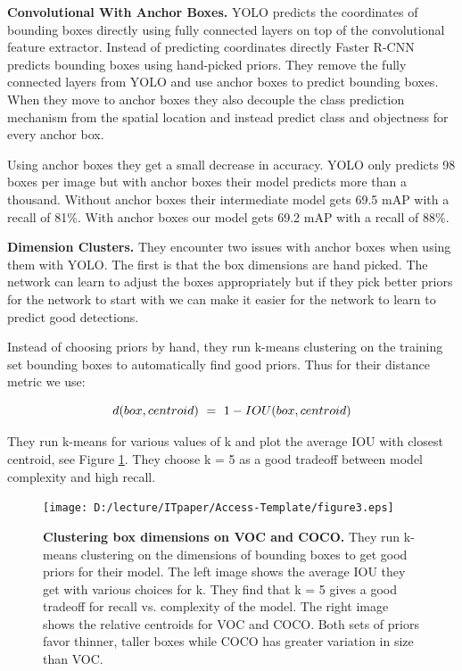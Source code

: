 \documentclass{ieeeaccess}
\begin{document}
\textbf{Convolutional With Anchor Boxes.} YOLO predicts the coordinates of bounding boxes directly using fully connected layers on top of the convolutional feature extractor. Instead of predicting coordinates directly Faster R-CNN predicts bounding boxes using hand-picked priors. They remove the fully connected layers from YOLO and use anchor boxes to predict bounding boxes. When they move to anchor boxes they also decouple the class prediction mechanism from the spatial location and instead predict class and objectness for every anchor box.

Using anchor boxes they get a small decrease in accuracy. YOLO only predicts 98 boxes per image but with anchor boxes their model predicts more than a thousand. Without anchor boxes their intermediate model gets 69.5 mAP with a recall of 81\%. With anchor boxes our model gets 69.2 mAP with a recall of 88\%.

\textbf{Dimension Clusters.} They encounter two issues with anchor boxes when using them with YOLO. The first is that the box dimensions are hand picked. The network can learn to adjust the boxes appropriately but if they pick better priors for the network to start with we can make it easier for the network to learn to predict good detections.

Instead of choosing priors by hand, they run k-means clustering on the training set bounding boxes to automatically find good priors. Thus for their distance metric we use:

\begin{equation}
	\label{equation3}
	 d(box, centroid) \ = \ 1 - IOU(box, centroid) \\
\end{equation}

They run k-means for various values of k and plot the average IOU with closest centroid, see Figure \ref{fig:figure3}. They choose k = 5 as a good tradeoff between model complexity and high recall.

\begin{figure}
	\centering
		\texttt{[image: D:/lecture/ITpaper/Access-Template/figure3.eps]}
	\caption {\textbf{Clustering box dimensions on VOC and COCO.} They run k-means clustering on the dimensions of bounding boxes to get good priors for their model. The left image shows the average IOU they get with various choices for k. They find that k = 5 gives a good tradeoff for recall vs. complexity of the model. The right image shows the relative centroids for VOC and COCO. Both sets of priors favor thinner, taller boxes while COCO has greater variation in
size than VOC.}
	\label{fig:figure3}
\end{figure}
\end{document}
